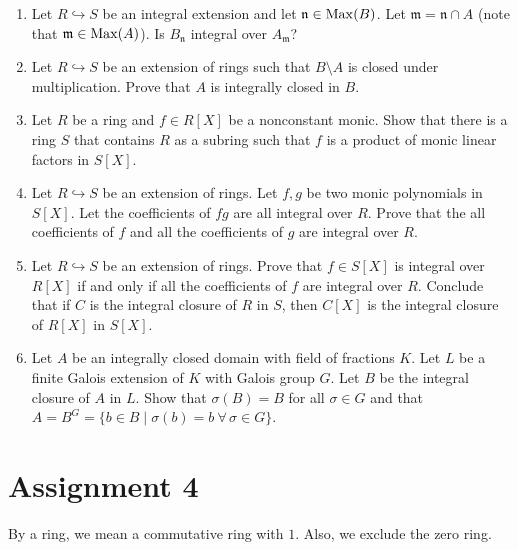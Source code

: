 \begin{enumerate}[label=\arabic*.]
\item Let $R \hookrightarrow S$ be an integral extension and let $\mathfrak n \in \operatorname{Max}(B)$. Let $\mathfrak m = \mathfrak n \cap A$ (note that $\mathfrak m \in \operatorname{Max}(A)$). Is $B_{\mathfrak n}$ integral over $A_{\mathfrak m}$?

\item Let $R \hookrightarrow S$ be an extension of rings such that $B \setminus A$ is closed under multiplication. Prove that $A$ is integrally closed in $B$.

\item Let $R$ be a ring and $f \in R[X]$ be a nonconstant monic. Show that there is a ring $S$ that contains $R$ as a subring such that $f$ is a product of monic linear factors in $S[X]$.

\item Let $R \hookrightarrow S$ be an extension of rings. Let $f,g$ be two monic polynomials in $S[X]$. Let the coefficients of $fg$ are all integral over $R$. Prove that the all coefficients of $f$ and all the coefficients of $g$ are integral over $R$.

\item Let $R \hookrightarrow S$ be an extension of rings. Prove that $f \in S[X]$ is integral over $R[X]$ if and only if all the coefficients of $f$ are integral over $R$. Conclude that if $C$ is the integral closure of $R$ in $S$, then $C[X]$ is the integral closure of $R[X]$ in $S[X]$.

\item Let $A$ be an integrally closed domain with field of fractions $K$. Let $L$ be a finite Galois extension of $K$ with Galois group $G$. Let $B$ be the integral closure of $A$ in $L$. Show that $\sigma(B) = B$ for all $\sigma \in G$ and that $A = B^G = \{ b \in B \mid \sigma(b) = b\ \forall\, \sigma \in G \}$.

\end{enumerate}

\section{Assignment 4}

\begin{convention}
By a ring, we mean a commutative ring with $1$. Also, we exclude the zero ring.
\end{convention}

